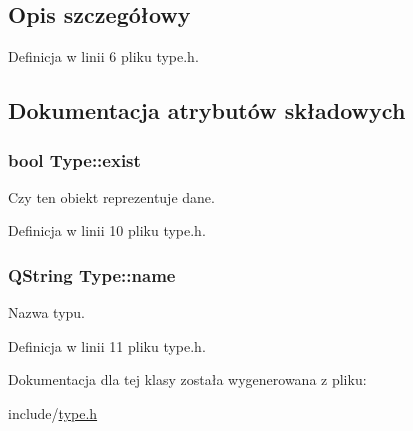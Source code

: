\subsection{Opis szczegółowy}


Definicja w linii 6 pliku type.h.



\subsection{Dokumentacja atrybutów składowych}
\hypertarget{classType_a443615a82c231e8d640b1b44e53d64b4}{
\subsubsection[{exist}]{\setlength{\rightskip}{0pt plus 5cm}bool {\bf Type::exist}}}
\label{classType_a443615a82c231e8d640b1b44e53d64b4}


Czy ten obiekt reprezentuje dane. 



Definicja w linii 10 pliku type.h.

\hypertarget{classType_a6e24434e904a6dfd418c73f160460bac}{
\subsubsection[{name}]{\setlength{\rightskip}{0pt plus 5cm}QString {\bf Type::name}}}
\label{classType_a6e24434e904a6dfd418c73f160460bac}


Nazwa typu. 



Definicja w linii 11 pliku type.h.



Dokumentacja dla tej klasy została wygenerowana z pliku:\begin{DoxyCompactItemize}
\item 
include/\hyperlink{type_8h}{type.h}\end{DoxyCompactItemize}
